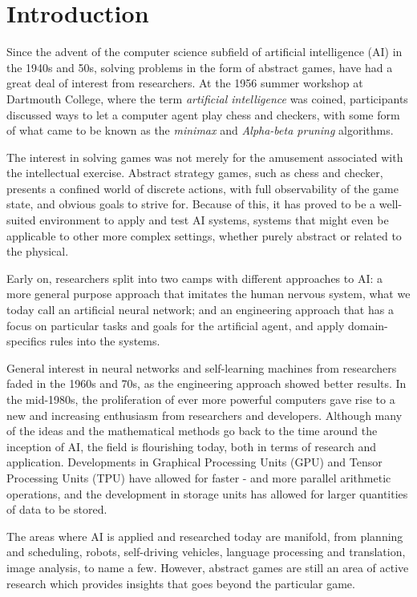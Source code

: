 \chapter{Introduction}

Since the advent of the computer science subfield of artificial intelligence (AI) in the 1940s and 50s, solving problems in the form of abstract games, have had a great deal of interest from researchers. At the 1956 summer workshop at Dartmouth College, where the term \textit{artificial intelligence} was coined, participants discussed ways to let a computer agent play chess and checkers, with some form of what came to be known as the \textit{minimax} and \textit{Alpha-beta pruning} algorithms\cite{McCarthy2006, Russell2010}.

The interest in solving games was not merely for the amusement associated with the intellectual exercise. Abstract strategy games, such as chess and checker, presents a confined world of discrete actions, with full observability of the game state, and obvious goals to strive for. Because of this, it has proved to be a well-suited environment to apply and test AI systems, systems that might even be applicable to other more complex settings, whether purely abstract or related to the physical.

Early on, researchers split into two camps with different approaches to AI: a more general purpose approach that imitates the human nervous system, what we today call an artificial neural network; and an engineering approach that has a focus on particular tasks and goals for the artificial agent, and apply domain-specifics rules into the systems\cite{McCarthy2006}.

General interest in neural networks and self-learning machines from researchers faded in the 1960s and 70s, as the engineering approach showed better results. In the mid-1980s, the proliferation of ever more powerful computers gave rise to a new and increasing enthusiasm from researchers and developers. Although many of the ideas and the mathematical methods go back to the time around the inception of AI, the field is flourishing today, both in terms of research and application. Developments in Graphical Processing Units (GPU) and Tensor Processing Units (TPU) have allowed for faster - and more parallel arithmetic operations, and the development in storage units has allowed for larger quantities of data to be stored\cite{Russell2010}.

The areas where AI is applied and researched today are manifold, from planning and scheduling, robots, self-driving vehicles, language processing and translation, image analysis, to name a few. However, abstract games are still an area of active research which provides insights that goes beyond the particular game.

